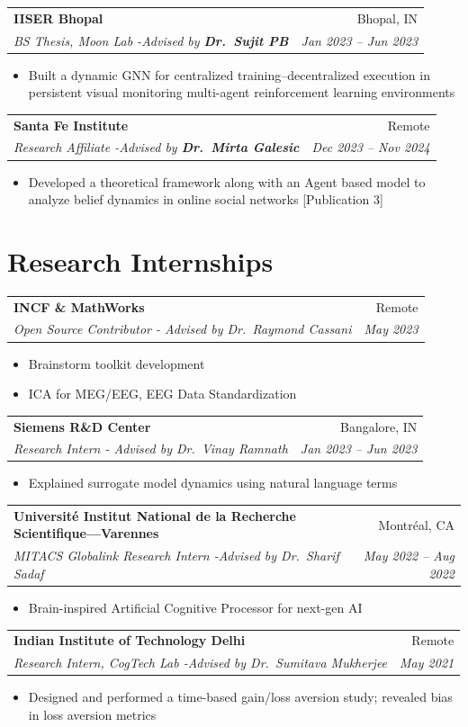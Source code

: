 \documentclass[10pt, letterpaper]{article}
\makeatletter
\newcommand{\entry}[4]{%
  \vspace{4pt}
  \begin{tabularx}{\linewidth}{@{}X r@{}}
    \small\textbf{#2} & \small #3 \\
    \small\textit{#1} & \small\textit{#4} \\
  \end{tabularx}%
}
\makeatother
\begin{document}
\entry
  {BS Thesis, Moon Lab \normalfont -Advised by \textbf{Dr.\ Sujit PB}}
  {IISER Bhopal}
  {Bhopal, IN}
  {Jan 2023 – Jun 2023}
\begin{itemize}
  \item Built a dynamic GNN for centralized training–decentralized execution
        in persistent visual monitoring multi-agent reinforcement learning environments 
\end{itemize}

\entry
  {Research Affiliate \normalfont -Advised by \textbf{Dr.\ Mirta Galesic}}
  {Santa Fe Institute}
  {Remote}
  {Dec 2023 – Nov 2024}
\begin{itemize}
  \item Developed a theoretical framework along with an Agent based model to analyze belief dynamics in online
        social networks [Publication 3]
\end{itemize}

\section{Research Internships}

\entry
  {Open Source Contributor \normalfont - Advised by Dr.\ Raymond Cassani}
  {INCF \& MathWorks}
  {Remote}
  {May 2023}
\begin{itemize}
  \item Brainstorm toolkit development
  \item ICA for MEG/EEG, EEG Data Standardization
\end{itemize}

\entry
  {Research Intern \normalfont - Advised by Dr.\ Vinay Ramnath}
  {Siemens R\&D Center}
  {Bangalore, IN}
  {Jan 2023 – Jun 2023}
\begin{itemize}
  \item Explained surrogate model dynamics using natural language terms
\end{itemize}

\entry
  {MITACS Globalink Research Intern \normalfont -Advised by Dr.\ Sharif Sadaf}
  {Université Institut National de la Recherche Scientifique—Varennes}
  {Montréal, CA}
  {May 2022 – Aug 2022}
\begin{itemize}
  \item Brain-inspired Artificial Cognitive Processor for next-gen AI
\end{itemize}

\entry
  {Research Intern, CogTech Lab \normalfont -Advised by Dr.\ Sumitava Mukherjee}
  {Indian Institute of Technology Delhi}
  {Remote}
  {May 2021}
\begin{itemize}
  \item Designed and performed a time-based gain/loss aversion study;
        revealed bias in loss aversion metrics
\end{itemize}
\end{document}
